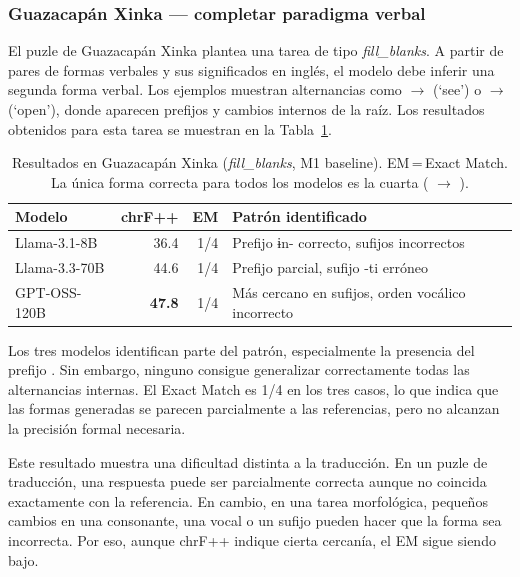 \subsubsection*{Guazacapán Xinka — completar paradigma verbal}

El puzle de Guazacapán Xinka plantea una tarea de tipo \textit{fill\_blanks}. A partir de pares de formas verbales y sus significados en inglés, el modelo debe inferir una segunda forma verbal. Los ejemplos muestran alternancias como  $\rightarrow$  (`see') o  $\rightarrow$  (`open'), donde aparecen prefijos y cambios internos de la raíz.
Los resultados obtenidos para esta tarea se muestran en la Tabla~\ref{tab:xinka}.

\begin{table}[h]
	\centering
	\caption{Resultados en Guazacapán Xinka (\textit{fill\_blanks}, M1 baseline). EM\,=\,Exact Match. La única forma correcta para todos los modelos es la cuarta ( $\rightarrow$ ).}
	\label{tab:xinka}
	\begin{tabular}{lrrl}
		\toprule
		\textbf{Modelo} & \textbf{chrF++} & \textbf{EM} & \textbf{Patrón identificado} \\
		\midrule
		Llama-3.1-8B   & 36.4 & 1/4 & Prefijo ɨn- correcto, sufijos incorrectos \\
		Llama-3.3-70B  & 44.6 & 1/4 & Prefijo parcial, sufijo -ti erróneo \\
		GPT-OSS-120B   & \textbf{47.8} & 1/4 & Más cercano en sufijos, orden vocálico incorrecto \\
		\bottomrule
	\end{tabular}
\end{table}

Los tres modelos identifican parte del patrón, especialmente la presencia del prefijo . Sin embargo, ninguno consigue generalizar correctamente todas las alternancias internas. El Exact Match es 1/4 en los tres casos, lo que indica que las formas generadas se parecen parcialmente a las referencias, pero no alcanzan la precisión formal necesaria.

Este resultado muestra una dificultad distinta a la traducción. En un puzle de traducción, una respuesta puede ser parcialmente correcta aunque no coincida exactamente con la referencia. En cambio, en una tarea morfológica, pequeños cambios en una consonante, una vocal o un sufijo pueden hacer que la forma sea incorrecta. Por eso, aunque chrF++ indique cierta cercanía, el EM sigue siendo bajo.

